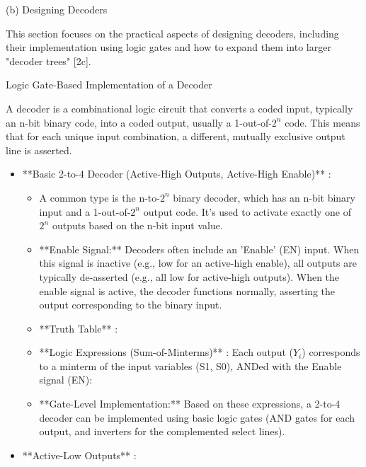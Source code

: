 \documentclass{article}
\begin{document}
\begin{itemize}
(b) Designing Decoders

This section focuses on the practical aspects of designing decoders, including their implementation using logic gates and how to expand them into larger "decoder trees" [2c].

Logic Gate-Based Implementation of a Decoder

A decoder is a combinational logic circuit that converts a coded input, typically an n-bit binary code, into a coded output, usually a 1-out-of-$2^n$ code. This means that for each unique input combination, a different, mutually exclusive output line is asserted.

\begin{itemize}
    \item **Basic 2-to-4 Decoder (Active-High Outputs, Active-High Enable)** :
    
        \begin{itemize}
            \item A common type is the n-to-$2^n$ binary decoder, which has an n-bit binary input and a 1-out-of-$2^n$ output code. It's used to activate exactly one of $2^n$ outputs based on the n-bit input value.
            \item **Enable Signal:** Decoders often include an 'Enable' (EN) input. When this signal is inactive (e.g., low for an active-high enable), all outputs are typically de-asserted (e.g., all low for active-high outputs). When the enable signal is active, the decoder functions normally, asserting the output corresponding to the binary input.
            \item **Truth Table** :
            \item **Logic Expressions (Sum-of-Minterms)** : Each output ($Y_i$) corresponds to a minterm of the input variables (S1, S0), ANDed with the Enable signal (EN):
            
            \item **Gate-Level Implementation:** Based on these expressions, a 2-to-4 decoder can be implemented using basic logic gates (AND gates for each output, and inverters for the complemented select lines).
        \end{itemize}
    \item **Active-Low Outputs** :
    

\end{itemize}
\end{itemize}
\end{document}
